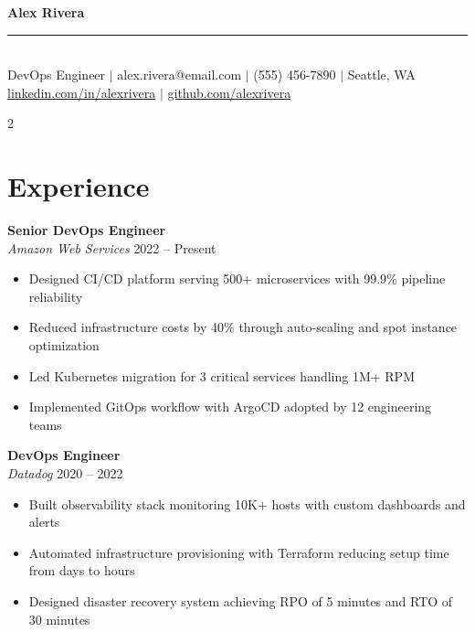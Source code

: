 \documentclass[10pt,letterpaper]{article}
\begin{document}
\begin{center}
  {\fontsize{22}{26}\selectfont\bfseries\color{sidebar} Alex Rivera} \\[3pt]
  {\color{accent}\rule{60pt}{1.5pt}} \\[5pt]
  {\normalsize\color{lightgray}
    DevOps Engineer \enspace$|$\enspace
    alex.rivera@email.com \enspace$|$\enspace
    (555) 456-7890 \enspace$|$\enspace
    Seattle, WA
  } \\[2pt]
  {\small\color{lightgray}
    \href{https://linkedin.com/in/alexrivera}{linkedin.com/in/alexrivera} \enspace$|$\enspace
    \href{https://github.com/alexrivera}{github.com/alexrivera}
  }
\end{center}
\vspace{4pt}

\begin{multicols}{2}


\section{Experience}

\textbf{\color{darkgray}Senior DevOps Engineer} \\
{\color{accent}\textit{Amazon Web Services}} \hfill {\small\color{lightgray} 2022 -- Present}
\begin{itemize}[leftmargin=1em, topsep=1pt, itemsep=0pt, parsep=1pt]
  \item Designed CI/CD platform serving 500+ microservices with 99.9\% pipeline reliability
  \item Reduced infrastructure costs by 40\% through auto-scaling and spot instance optimization
  \item Led Kubernetes migration for 3 critical services handling 1M+ RPM
  \item Implemented GitOps workflow with ArgoCD adopted by 12 engineering teams
\end{itemize}
\vspace{3pt}

\textbf{\color{darkgray}DevOps Engineer} \\
{\color{accent}\textit{Datadog}} \hfill {\small\color{lightgray} 2020 -- 2022}
\begin{itemize}[leftmargin=1em, topsep=1pt, itemsep=0pt, parsep=1pt]
  \item Built observability stack monitoring 10K+ hosts with custom dashboards and alerts
  \item Automated infrastructure provisioning with Terraform reducing setup time from days to hours
  \item Designed disaster recovery system achieving RPO of 5 minutes and RTO of 30 minutes
\end{itemize}
\vspace{3pt}


\end{multicols}
\end{document}
